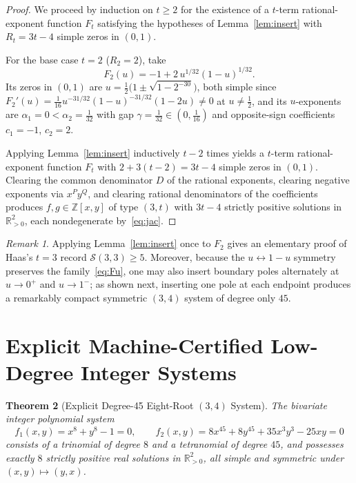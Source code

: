 \documentclass[11pt,a4paper]{amsart}
\newtheorem{theorem}{Theorem}
\theoremstyle{remark}
\newtheorem{remark}[theorem]{Remark}
\newcommand{\R}{\mathbb{R}}
\newcommand{\Z}{\mathbb{Z}}
\newcommand{\Sfn}{\mathcal{S}}
\begin{document}
\begin{proof}
We proceed by induction on $t \ge 2$ for the existence of a $t$-term rational-exponent function $F_t$ satisfying the hypotheses of Lemma~\ref{lem:insert} with $R_t = 3t - 4$ simple zeros in $(0, 1)$.

For the base case $t = 2$ ($R_2 = 2$), take
\[
  F_2(u) = -1 + 2\, u^{1/32}(1-u)^{1/32}.
\]
Its zeros in $(0, 1)$ are $u = \frac{1}{2}\big(1 \pm \sqrt{1 - 2^{-30}}\big)$, both simple since $F_2'(u) = \frac{1}{16} u^{-31/32}(1-u)^{-31/32}(1 - 2u) \neq 0$ at $u \neq \frac{1}{2}$, and its $u$-exponents are $\alpha_1 = 0 < \alpha_2 = \frac{1}{32}$ with gap $\gamma = \frac{1}{32} \in (0, \frac{1}{16})$ and opposite-sign coefficients $c_1 = -1$, $c_2 = 2$.

Applying Lemma~\ref{lem:insert} inductively $t - 2$ times yields a $t$-term rational-exponent function $F_t$ with $2 + 3(t - 2) = 3t - 4$ simple zeros in $(0, 1)$. Clearing the common denominator $D$ of the rational exponents, clearing negative exponents via $x^P y^Q$, and clearing rational denominators of the coefficients produces $f, g \in \Z[x, y]$ of type $(3, t)$ with $3t - 4$ strictly positive solutions in $\R_{>0}^2$, each nondegenerate by~\eqref{eq:jac}.
\end{proof}

\begin{remark}
Applying Lemma~\ref{lem:insert} once to $F_2$ gives an elementary proof of Haas's $t = 3$ record $\Sfn(3, 3) \ge 5$. Moreover, because the $u \leftrightarrow 1 - u$ symmetry preserves the family~\eqref{eq:Fu}, one may also insert boundary poles alternately at $u \to 0^+$ and $u \to 1^-$; as shown next, inserting one pole at each endpoint produces a remarkably compact symmetric $(3, 4)$ system of degree only $45$.
\end{remark}

\section{Explicit Machine-Certified Low-Degree Integer Systems}

\begin{theorem}[Explicit Degree-45 Eight-Root $(3, 4)$ System]\label{thm:deg45}
The bivariate integer polynomial system
\begin{equation}\label{eq:deg45}
  f_1(x, y) = x^8 + y^8 - 1 = 0, \qquad
  f_2(x, y) = 8 x^{45} + 8 y^{45} + 35 x^3 y^3 - 25 x y = 0
\end{equation}
consists of a trinomial of degree $8$ and a tetranomial of degree $45$, and possesses exactly $8$ strictly positive real solutions in $\R_{>0}^2$, all simple and symmetric under $(x, y) \mapsto (y, x)$.
\end{theorem}
\end{document}
